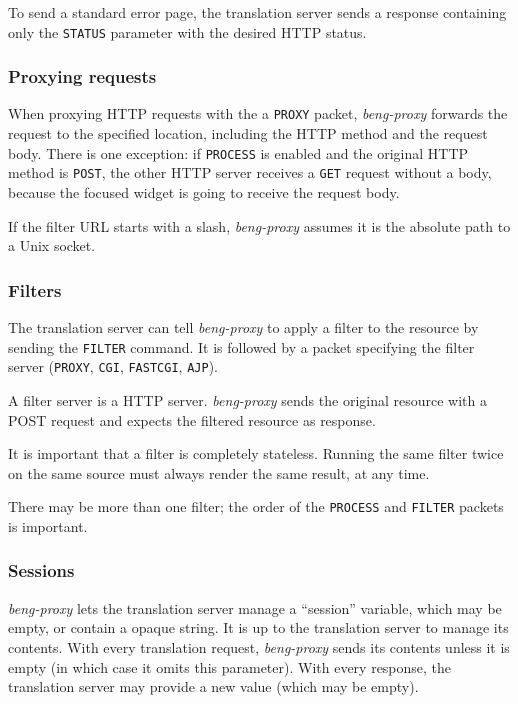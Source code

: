 \documentclass[a4paper,12pt]{article}
\begin{document}
To send a standard error page, the translation server sends a response
containing only the \texttt{STATUS} parameter with the desired HTTP
status.

\subsubsection{Proxying requests}

When proxying HTTP requests with the a \texttt{PROXY} packet,
\emph{beng-proxy} forwards the request to the specified location,
including the HTTP method and the request body.  There is one
exception: if \texttt{PROCESS} is enabled and the original HTTP method
is \texttt{POST}, the other HTTP server receives a \texttt{GET}
request without a body, because the focused widget is going to receive
the request body.

If the filter URL starts with a slash, \emph{beng-proxy} assumes it is
the absolute path to a Unix socket.

\subsubsection{Filters}
\label{filter}

The translation server can tell \emph{beng-proxy} to apply a filter to
the resource by sending the \texttt{FILTER} command.  It is followed
by a packet specifying the filter server (\texttt{PROXY},
\texttt{CGI}, \texttt{FASTCGI}, \texttt{AJP}).

A filter server is a HTTP server.  \emph{beng-proxy} sends the
original resource with a POST request and expects the filtered
resource as response.

It is important that a filter is completely stateless.  Running the
same filter twice on the same source must always render the same
result, at any time.

There may be more than one filter; the order of the \texttt{PROCESS}
and \texttt{FILTER} packets is important.

\subsubsection{Sessions}
\label{sessions}

\emph{beng-proxy} lets the translation server manage a ``session''
variable, which may be empty, or contain a opaque string.  It is up to
the translation server to manage its contents.  With every translation
request, \emph{beng-proxy} sends its contents unless it is empty (in
which case it omits this parameter).  With every response, the
translation server may provide a new value (which may be empty).
\end{document}
